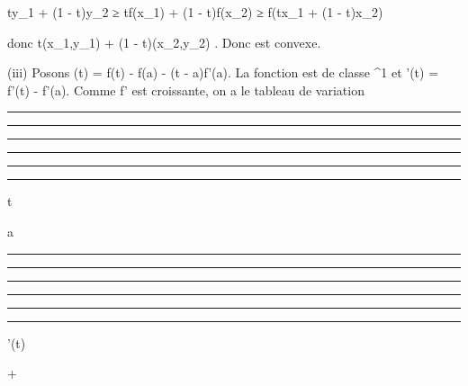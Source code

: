 \documentclass[]{article}
\begin{document}
ty_1 + (1 - t)y_2 ≥ tf(x_1) + (1 -
t)f(x_2) ≥ f(tx_1 + (1 - t)x_2)

donc t(x_1,y_1) + (1 - t)(x_2,y_2) \in
\Gamma. Donc \Gamma est convexe.

(iii) Posons \phi(t) = f(t) - f(a) - (t - a)f'(a). La fonction \phi est de
classe ^1 et \phi'(t) = f'(t) - f'(a). Comme f' est croissante,
on a le tableau de variation

\begin{center}\rule{3in}{0.4pt}\end{center}

\begin{center}\rule{3in}{0.4pt}\end{center}

\begin{center}\rule{3in}{0.4pt}\end{center}

\begin{center}\rule{3in}{0.4pt}\end{center}

\begin{center}\rule{3in}{0.4pt}\end{center}

\begin{center}\rule{3in}{0.4pt}\end{center}

t

a

\begin{center}\rule{3in}{0.4pt}\end{center}

\begin{center}\rule{3in}{0.4pt}\end{center}

\begin{center}\rule{3in}{0.4pt}\end{center}

\begin{center}\rule{3in}{0.4pt}\end{center}

\begin{center}\rule{3in}{0.4pt}\end{center}

\begin{center}\rule{3in}{0.4pt}\end{center}

\phi'(t)

+
\end{document}

